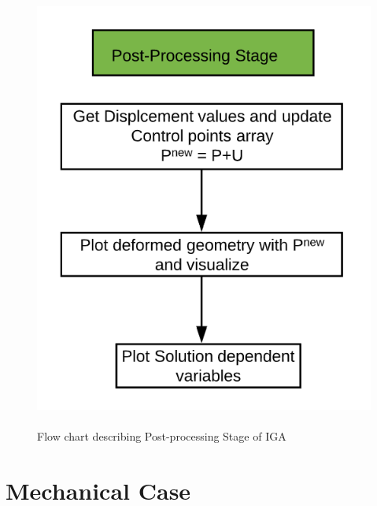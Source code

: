 \documentclass[11pt]{article}
\begin{document}
\begin{figure}[H]
	\begin{center}
		\includegraphics[scale=0.5]{PostProcessing.png} 
		\caption{\\Flow chart describing Post-processing Stage of IGA}\label{PostProcessing}
	\end{center}
	
\end{figure}

\newpage
\section{Mechanical Case}
\end{document}
